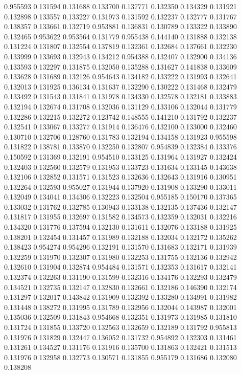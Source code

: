 0.955593
0.131594
0.131688
0.133700
0.137771
0.132350
0.134329
0.131921
0.132898
0.133557
0.133227
0.131973
0.131592
0.132237
0.132777
0.131767
0.138357
0.133661
0.132719
0.953881
0.136831
0.130789
0.133322
0.133890
0.132465
0.953622
0.953564
0.131779
0.955438
0.144140
0.131888
0.132138
0.131224
0.131807
0.132554
0.137819
0.132361
0.132684
0.137661
0.132230
0.133999
0.133693
0.132943
0.134212
0.954388
0.132407
0.132900
0.134136
0.133593
0.132297
0.131875
0.132050
0.135288
0.131627
0.141838
0.133609
0.133628
0.131689
0.132126
0.954643
0.134182
0.133222
0.131993
0.132641
0.132013
0.131925
0.136134
0.131637
0.132290
0.130222
0.131468
0.132479
0.133492
0.131543
0.131841
0.131978
0.134330
0.132578
0.132181
0.133883
0.132194
0.132674
0.131708
0.132036
0.131129
0.133106
0.132044
0.131779
0.132286
0.132215
0.132272
0.123742
0.148555
0.141210
0.131792
0.132237
0.132541
0.133067
0.133277
0.131914
0.136476
0.132100
0.133000
0.132460
0.130710
0.132706
0.128760
0.131783
0.132194
0.134158
0.131923
0.955598
0.131822
0.138781
0.133870
0.132250
0.132807
0.954839
0.132384
0.133376
0.150592
0.131369
0.132191
0.954510
0.133125
0.131964
0.131927
0.132424
0.132403
0.132560
0.132579
0.131953
0.133723
0.131634
0.133145
0.143638
0.132106
0.132852
0.131571
0.131523
0.132636
0.132643
0.131916
0.130951
0.132264
0.132593
0.955027
0.131944
0.137920
0.131908
0.133290
0.133011
0.132049
0.134041
0.134306
0.132223
0.132504
0.955185
0.150170
0.137365
0.133032
0.131762
0.132785
0.130943
0.133138
0.132135
0.137436
0.132147
0.131817
0.131955
0.132697
0.131582
0.134573
0.132359
0.132031
0.132216
0.134320
0.131776
0.137594
0.132130
0.131611
0.132076
0.133188
0.131925
0.138201
0.132454
0.131457
0.131989
0.132188
0.132034
0.132172
0.135262
0.138423
0.954274
0.954296
0.132191
0.131570
0.131683
0.132171
0.131939
0.132259
0.131970
0.132307
0.131980
0.132253
0.131755
0.132136
0.132942
0.132610
0.131904
0.132874
0.954484
0.131571
0.132353
0.131617
0.132141
0.132374
0.132263
0.131190
0.131599
0.132316
0.134176
0.132293
0.132479
0.134521
0.132735
0.132147
0.132830
0.132661
0.132186
0.146390
0.132174
0.131297
0.132017
0.143842
0.131909
0.132392
0.133280
0.134991
0.131982
0.131448
0.138272
0.131995
0.131789
0.132956
0.132044
0.143987
0.132001
0.135036
0.132509
0.131843
0.954668
0.132351
0.131973
0.131985
0.131810
0.131724
0.131855
0.133720
0.132563
0.132659
0.132189
0.131792
0.955813
0.131976
0.131829
0.132447
0.136052
0.131732
0.954892
0.132303
0.131461
0.131261
0.134527
0.131176
0.131916
0.135700
0.131863
0.132421
0.131513
0.131976
0.132958
0.132773
0.130571
0.131855
0.955179
0.131686
0.132080
0.138208
